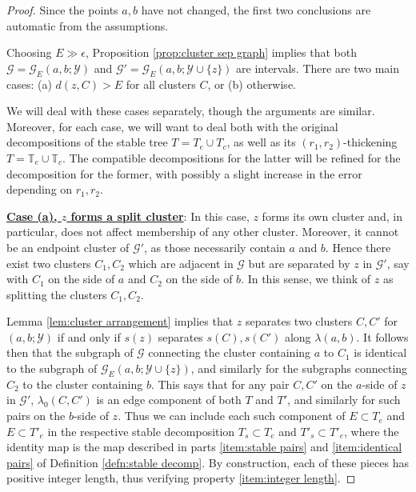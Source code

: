 \documentclass{amsart}
\theoremstyle{definition}
\theoremstyle{remark}
\theoremstyle{definition}
\newcommand{\calG}{\mathcal{G}}
\newcommand{\calY}{\mathcal{Y}}
\newcommand{\bT}{\mathbb{T}}
\begin{document}
\begin{proof}
Since the points $a,b$ have not changed, the first two conclusions are automatic from the assumptions.

Choosing $E \gg \epsilon$, Proposition \ref{prop:cluster sep graph} implies that both $\calG = \calG_E(a,b;\calY)$ and $\calG' = \calG_E(a,b;\calY \cup \{z\})$ are intervals.  There are two main cases: (a) $d(z,C)>E$ for all clusters $C$, or (b) otherwise.

We will deal with these cases separately, though the arguments are similar.  Moreover, for each case, we will want to deal both with the original decompositions of the stable tree $T = T_e \cup T_c$, as well as its $(r_1,r_2)$-thickening $T = \bT_{e} \cup \bT_{c}$.  The compatible decompositions for the latter will be refined for the decomposition for the former, with possibly a slight increase in the error depending on $r_1,r_2$.

\medskip

\underline{\textbf{Case (a), $z$ forms a split cluster}}: In this case, $z$ forms its own cluster and, in particular, does not affect membership of any other cluster.  Moreover, it cannot be an endpoint cluster of $\calG'$, as those necessarily contain $a$ and $b$.  Hence there exist two clusters $C_1,C_2$ which are adjacent in $\calG$ but are separated by $z$ in $\calG'$, say with $C_1$ on the side of $a$ and $C_2$ on the side of $b$.  In this sense, we think of $z$ as splitting the clusters $C_1,C_2$.

Lemma \ref{lem:cluster arrangement} implies that $z$ separates two clusters $C,C'$ for $(a,b;\calY)$ if and only if $s(z)$ separates $s(C), s(C')$ along $\lambda(a,b)$.  It follows then that the subgraph of $\calG$ connecting the cluster containing $a$ to $C_1$ is identical to the subgraph of $\calG_E(a,b;\calY \cup \{z\})$, and similarly for the subgraphs connecting $C_2$ to the cluster containing $b$.  This says that for any pair $C,C'$ on the $a$-side of $z$ in $\calG'$, $\lambda_0(C,C')$ is an edge component of both $T$ and $T'$, and similarly for such pairs  on the $b$-side of $z$.  Thus we can include each such component of $E \subset T_e$ and $E \subset T'_e$ in the respective stable decomposition $T_s \subset T_e$ and $T'_s \subset T'_e$, where the identity map is the map described in parts \eqref{item:stable pairs} and \eqref{item:identical pairs} of Definition \ref{defn:stable decomp}.  By construction, each of these pieces has positive integer length, thus verifying property \eqref{item:integer length}.


\end{proof}
\end{document}

